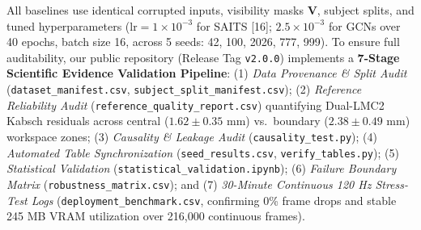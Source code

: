 All baselines use identical corrupted inputs, visibility masks $\mathbf{V}$, subject splits, and tuned hyperparameters ($\text{lr} = 1\times 10^{-3}$ for SAITS [16]; $2.5\times 10^{-3}$ for GCNs over 40 epochs, batch size 16, across 5 seeds: 42, 100, 2026, 777, 999). To ensure full auditability, our public repository (Release Tag \texttt{v2.0.0}) implements a \textbf{7-Stage Scientific Evidence Validation Pipeline}: (1) \textit{Data Provenance \& Split Audit} (\texttt{dataset\_manifest.csv}, \texttt{subject\_split\_manifest.csv}); (2) \textit{Reference Reliability Audit} (\texttt{reference\_quality\_report.csv}) quantifying Dual-LMC2 Kabsch residuals across central ($1.62 \pm 0.35$ mm) vs.\ boundary ($2.38 \pm 0.49$ mm) workspace zones; (3) \textit{Causality \& Leakage Audit} (\texttt{causality\_test.py}); (4) \textit{Automated Table Synchronization} (\texttt{seed\_results.csv}, \texttt{verify\_tables.py}); (5) \textit{Statistical Validation} (\texttt{statistical\_validation.ipynb}); (6) \textit{Failure Boundary Matrix} (\texttt{robustness\_matrix.csv}); and (7) \textit{30-Minute Continuous 120 Hz Stress-Test Logs} (\texttt{deployment\_benchmark.csv}, confirming 0\% frame drops and stable 245 MB VRAM utilization over 216,000 continuous frames).

\caption{Subject-independent empirical comparison of overall 3D skeletal restoration error ($\text{MPJPE}_{\text{all}}$ in mm $\downarrow$) across all four controlled trajectory degradation levels (Levels 1--4) on (a) depth-based SHREC'17 ($N=28$) and (b) 6-DoF magnetic FPHA ($N=6$, evaluated under synthetic optical-like dropout profiles).}
